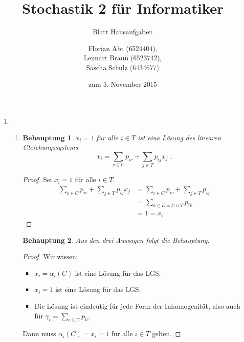 \documentclass[a4paper]{scrartcl}
\title{Stochastik 2 für Informatiker}
\subtitle{Blatt {\blattnr} Hausaufgaben}
\author{
    Florian Abt (6524404), \\
    Lennart Braun (6523742), \\
    Sascha Schulz (6434677)
}
\date{zum 3. November 2015}
\newtheorem*{behaupt}{Behauptung}
\def \blattnr {3}
\begin{document}
\maketitle

\begin{enumerate}[label=\bfseries \blattnr.\arabic*]
    \item
        \begin{enumerate}[label=\alph*)]
            \item
                \begin{behaupt}
                    $x_i = 1$ für alle $i \in T$ ist eine Lösung des linearen
                    Gleichungssystems
                    \begin{equation*}
                        x_i = \sum_{c \in C} p_{ic} + \sum_{j \in T} p_{ij} x_j
                        \text{ .}
                    \end{equation*}
                \end{behaupt}
                \begin{proof}
                    Sei $x_i = 1$ für alle $i \in T$.
                    \begin{equation*}
                        \begin{split}
                            \sum_{c \in C} p_{ic} + \sum_{j \in T} p_{ij} x_j
                            &= \sum_{c \in C} p_{ic} + \sum_{j \in T} p_{ij} \\
                            &= \sum_{k \in E = C \cup T} p_{ik} \\
                            &= 1 = x_i
                        \end{split}
                    \end{equation*}
                \end{proof}

                \begin{behaupt}
                    Aus den drei Aussagen folgt die Behauptung.
                \end{behaupt}
                \begin{proof}
                    Wir wissen:
                    \begin{itemize}
                        \item
                            $x_i = \alpha_i(C)$ ist eine Lösung für das LGS.
                        \item
                            $x_i = 1$ ist eine Lösung für das LGS.
                        \item
                            Die Lösung ist eindeutig für jede Form der
                            Inhomogenität, also auch für $\gamma_i = \sum_{c
                            \in C} p_{ic}$.
                    \end{itemize}
                    Dann muss $\alpha_i(C) = x_i = 1$ für alle $i \in T$
                    gelten.
                \end{proof}


\end{enumerate}
\end{enumerate}
\end{document}

